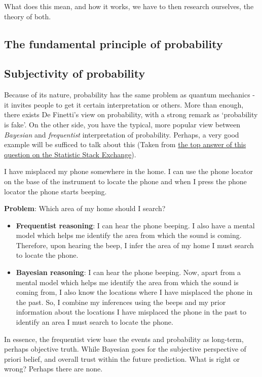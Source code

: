 What does this mean, and how it works, we have to then research ourselves, the theory of both. 

\subsection{The fundamental principle of probability}

\subsection{Subjectivity of probability}

Because of its nature, probability has the same problem as quantum mechanics - it invites people to get it certain interpretation or others. More than enough, there exists De Finetti's view on probability, with a strong remark as `probability is fake'. On the other side, you have the typical, more popular view between \textit{Bayesian} and \textit{frequentist} interpretation of probability. Perhaps, a very good example will be sufficed to talk about this (Taken from \href{https://stats.stackexchange.com/questions/22/bayesian-and-frequentist-reasoning-in-plain-english}{the top answer of this question on the Statistic Stack Exchange}).

I have misplaced my phone somewhere in the home. I can use the phone locator on the base of the instrument to locate the phone and when I press the phone locator the phone starts beeping.

\textbf{Problem}: Which area of my home should I search?
\begin{itemize}
    \item \textbf{Frequentist reasoning}: I can hear the phone beeping. I also have a mental model which helps me identify the area from which the sound is coming. Therefore, upon hearing the beep, I infer the area of my home I must search to locate the phone.
    \item \textbf{Bayesian reasoning}: I can hear the phone beeping. Now, apart from a mental model which helps me identify the area from which the sound is coming from, I also know the locations where I have misplaced the phone in the past. So, I combine my inferences using the beeps and my prior information about the locations I have misplaced the phone in the past to identify an area I must search to locate the phone.
\end{itemize}

In essence, the frequentist view base the events and probability as long-term, perhaps objective truth. While Bayesian goes for the subjective perspective of priori belief, and overall trust within the future prediction. What is right or wrong? Perhaps there are none. 
